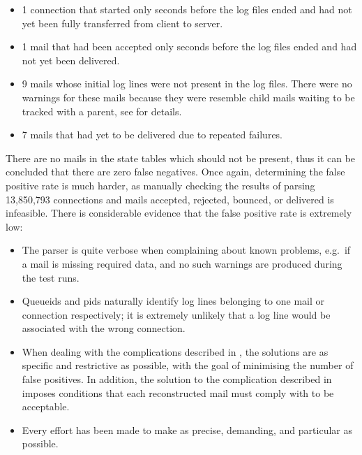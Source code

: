 \begin{itemize}

    \squeezeitems{}

    \item 1 connection that started only seconds before the log files
        ended and had not yet been fully transferred from client to server.

    \item 1 mail that had been accepted only seconds before the log files
        ended and had not yet been delivered.

    \item 9 mails whose initial log lines were not present in the log
        files.  There were no warnings for these mails because they were
        resemble child mails waiting to be tracked with a parent, see
         for details.

    \item 7 mails that had yet to be delivered due to repeated failures.

\end{itemize}

There are no mails in the state tables which should not be present, thus it
can be concluded that there are zero false negatives.  Once again,
determining the false positive rate is much harder, as manually checking
the results of parsing 13,850,793 connections and mails accepted, rejected,
bounced, or delivered is infeasible.  There is considerable evidence that
the false positive rate is extremely low:

\begin{itemize}

    \item The parser is quite verbose when complaining about known
        problems, e.g.\ if a mail is missing required data, and no such
        warnings are produced during the test runs.

    \item Queueids and \glspl{pid} naturally identify log lines belonging
        to one mail or connection respectively; it is extremely unlikely
        that a log line would be associated with the wrong connection.

    \item When dealing with the complications described in
        , the solutions are as specific and
        restrictive as possible, with the goal of minimising the number of
        false positives.  In addition, the solution to the complication
        described in  imposes conditions
        that each reconstructed mail must comply with to be acceptable.

    \item Every effort has been made to make \parsername{} as precise,
        demanding, and particular as possible.

\end{itemize}

